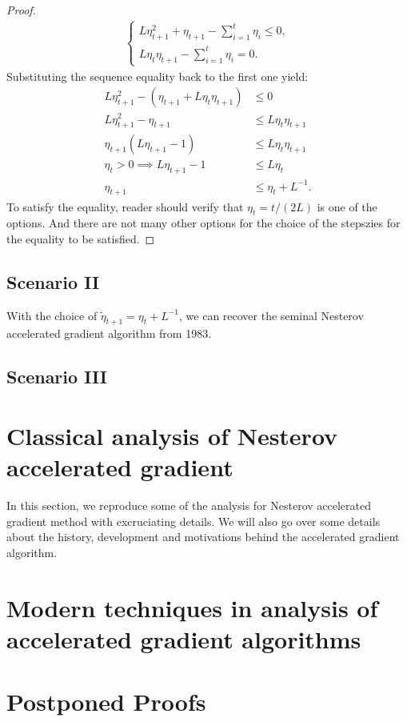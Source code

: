 \documentclass[12pt]{article}
\begin{document}
\begin{proof}
            \begin{align*}
                \begin{cases}
                    L\eta_{t + 1}^2 + \eta_{t + 1} - \sum_{i = 1}^{t}\eta_i 
                    \le 0, 
                    \\
                    L\eta_t \eta_{t + 1} - \sum_{i = 1}^{t} \eta_i 
                    = 0. 
                \end{cases}
            \end{align*}
            Substituting the sequence equality back to the first one yield: 
            \begin{align*}
                L\eta_{t + 1}^2 - (\eta_{t + 1} + L\eta_t\eta_{t + 1}) &\le 0 
                \\
                L\eta^2_{t + 1} - \eta_{t + 1}
                &\le 
                L\eta_t \eta_{t + 1} 
                \\
                \eta_{t + 1}(L\eta_{t + 1} - 1) 
                &\le L\eta_t\eta_{t + 1}
                \\
                \eta_t > 0 
                \implies 
                L\eta_{t + 1} - 1 &\le 
                L\eta_t 
                \\
                \eta_{t + 1} &\le \eta_t + L^{-1}. 
            \end{align*}
            To satisfy the equality, reader should verify that $\eta_{t} = t/(2L)$ is one of the options. 
            And there are not many other options for the choice of the stepszies for the equality to be satisfied. 
        \end{proof}

    \subsection{Scenario II}
        With the choice of $\tilde \eta_{t + 1} = \eta_t + L^{-1}$, we can recover the seminal Nesterov accelerated gradient algorithm from 1983. 

    \subsection{Scenario III}
    


\section{Classical analysis of Nesterov accelerated gradient}
    In this section, we reproduce some of the analysis for Nesterov accelerated gradient method with excruciating details. 
    We will also go over some details about the history, development and motivations behind the accelerated gradient algorithm. 

\section{Modern techniques in analysis of accelerated gradient algorithms}
    

\printbibliography

\appendix
\section*{Postponed Proofs}
\end{document}
